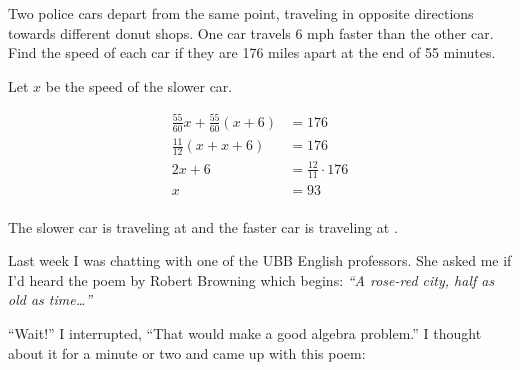 \documentclass[letterpaper, landscape]{exam}
\begin{document}
\begin{questions}




    \question{}
      Two police cars depart from the same point, traveling in opposite directions towards different donut shops. One
      car travels 6 mph faster than the other car.  Find the speed of each car if they are 176 miles apart at the end of
      55 minutes.

      \begin{solution}
        Let $x$ be the speed of the slower car.

        \begin{align*}
          \frac{55}{60} x + \frac{55}{60}(x + 6) & = 176 \\
          \frac{11}{12} (x + x + 6)              & = 176 \\
          2x + 6                                 & = \frac{12}{11} \cdot 176 \\
          x                                      & = 93 \\
        \end{align*}

        The slower car is traveling at  and the faster car is traveling at .

      \end{solution}

    \ifprintanswers{}
    \else
      \newpage
    \fi

    \question{}
      Last week I was chatting with one of the UBB English professors.  She asked me if I'd heard the poem by Robert
      Browning which begins: {\em ``A rose-red city, half as old as time\ldots ''\/}

      ``Wait!'' I interrupted,  ``That would make a good algebra problem.''  I thought about it for a minute or two and
      came up with this poem:


\end{questions}
\end{document}

